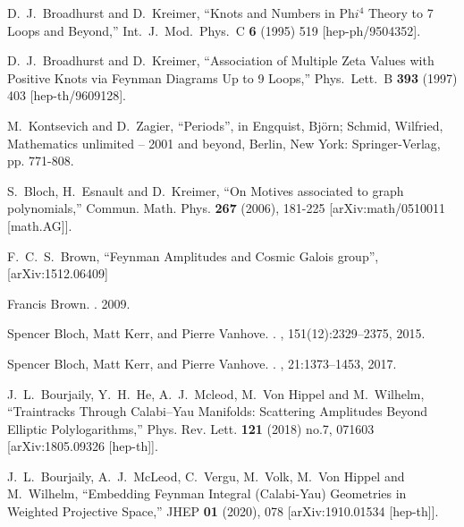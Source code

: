 \documentclass[a4paper,12pt]{article}
\numberwithin{equation}{section}
\numberwithin{figure}{section}
\begin{document}
\begin{thebibliography}{99}
D.~J.~Broadhurst and D.~Kreimer,
``Knots and Numbers in Ph$ i^4$ Theory to 7 Loops and Beyond,''
Int.\ J.\ Mod.\ Phys.\ C {\bf 6} (1995) 519
[hep-ph/9504352].

D.~J.~Broadhurst and D.~Kreimer,
``Association of Multiple Zeta Values with Positive Knots via Feynman Diagrams Up to 9 Loops,''
Phys.\ Lett.\ B {\bf 393} (1997) 403
[hep-th/9609128].


M.~Kontsevich and D.~Zagier, ``Periods'', in Engquist, Bj\"orn; Schmid,
Wilfried, Mathematics unlimited -- 2001 and beyond, Berlin, New York:
Springer-Verlag, pp. 771-808.

S.~Bloch, H.~Esnault and D.~Kreimer,
``On Motives associated to graph polynomials,''
Commun. Math. Phys. \textbf{267} (2006), 181-225
[arXiv:math/0510011 [math.AG]].


 F.~C.~S.~Brown, ``Feynman Amplitudes and Cosmic
  Galois group'', [arXiv:1512.06409]



Francis Brown.
.
 2009.
\newblock [arXiv:0910.0114]  

Spencer Bloch, Matt Kerr, and Pierre Vanhove.
.
, 151(12):2329--2375, 2015.
\newblock [arXiv:1406.2664] 

Spencer Bloch, Matt Kerr, and Pierre Vanhove.
.
, 21:1373--1453, 2017.
\newblock [arXiv:1601.08181]

J.~L.~Bourjaily, Y.~H.~He, A.~J.~Mcleod, M.~Von Hippel and M.~Wilhelm,
``Traintracks Through Calabi--Yau Manifolds: Scattering Amplitudes Beyond Elliptic Polylogarithms,''
Phys. Rev. Lett. \textbf{121} (2018) no.7, 071603
[arXiv:1805.09326 [hep-th]].
  

J.~L.~Bourjaily, A.~J.~McLeod, C.~Vergu, M.~Volk, M.~Von Hippel and M.~Wilhelm,
``Embedding Feynman Integral (Calabi-Yau) Geometries in Weighted Projective Space,''
JHEP \textbf{01} (2020), 078
[arXiv:1910.01534 [hep-th]].


\end{thebibliography}
\end{document}
